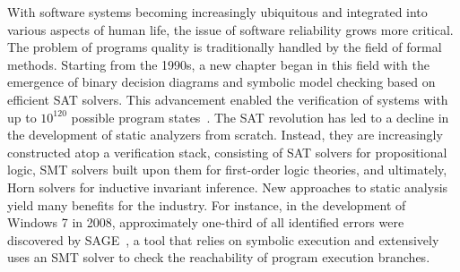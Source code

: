 {\actuality}
With software systems becoming increasingly ubiquitous and integrated into various aspects of human life, the issue of software reliability grows more critical.
The problem of programs quality is traditionally handled by the field of formal methods. Starting from the 1990s, a new chapter began in this field with the emergence of binary decision diagrams and symbolic model checking based on efficient SAT solvers. This advancement enabled the verification of systems with up to \(10^{120}\) possible program states~\cite{10.1007/3-540-61474-5_93}. The SAT revolution has led to a decline in the development of static analyzers from scratch. Instead, they are increasingly constructed atop a verification stack, consisting of SAT solvers for propositional logic, SMT solvers built upon them for first-order logic theories, and ultimately, Horn solvers for inductive invariant inference.
New approaches to static analysis yield many benefits for the industry.
For instance, in the development of Windows 7 in 2008, approximately one-third of all identified errors were discovered by SAGE~\cite{10.1145/2090147.2094081}, a tool that relies on symbolic execution and extensively uses an SMT solver to check the reachability of program execution branches.

